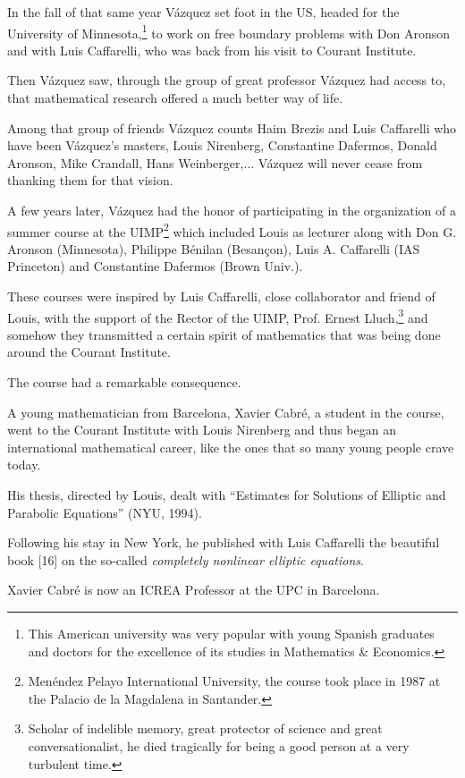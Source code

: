 \documentclass{article}
\begin{document}
%
In the fall of that same year V\'azquez set foot in the US, headed for the University of Minnesota,\footnote{This American university was very popular with young Spanish graduates and doctors for the excellence of its studies in Mathematics \& Economics.} to work on free boundary problems with Don Aronson and with Luis Caffarelli, who was back from his visit to Courant Institute.

Then V\'azquez saw, through the group of great professor V\'azquez had access to, that mathematical research offered a much better way of life.

Among that group of friends V\'azquez counts Haim Brezis and Luis Caffarelli who have been V\'azquez's masters, Louis Nirenberg, Constantine Dafermos, Donald Aronson, Mike Crandall, Hans Weinberger,$\ldots$ V\'azquez will never cease from thanking them for that vision.

%
A few years later, V\'azquez had the honor of participating in the organization of a summer course at the UIMP\footnote{Men\'endez Pelayo International University, the course took place in 1987 at the Palacio de la Magdalena in Santander.} which included Louis as lecturer along with Don G. Aronson (Minnesota), Philippe Bénilan (Besançon), Luis A. Caffarelli (IAS Princeton) and Constantine Dafermos (Brown Univ.).

These courses were inspired by Luis Caffarelli, close collaborator and friend of Louis, with the support of the Rector of the UIMP, Prof. Ernest Lluch,\footnote{Scholar of indelible memory, great protector of science and great conversationalist, he died tragically for being a good person at a very turbulent time.} and somehow they transmitted a certain spirit of mathematics that was being done around the Courant Institute.

The course had a remarkable consequence.

A young mathematician from Barcelona, Xavier Cabr\'e, a student in the course, went to the Courant Institute with Louis Nirenberg and thus began an international mathematical career, like the ones that so many young people crave today.

His thesis, directed by Louis, dealt with ``Estimates for Solutions of Elliptic and Parabolic Equations'' (NYU, 1994).

Following his stay in New York, he published with Luis Caffarelli the beautiful book [16] on the so-called \textit{completely nonlinear elliptic equations}.

Xavier Cabr\'e is now an ICREA Professor at the UPC in Barcelona.
\end{document}
